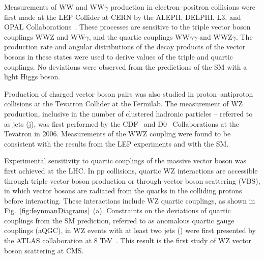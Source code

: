 Measurements of WW and WW$\gamma$ production in electron--positron collisions
were first made at the LEP
Collider at CERN by the ALEPH, DELPHI, L3, and OPAL Collaborations~\cite{LEP-2}.
These processes are sensitive to the triple vector boson couplings
WWZ and WW$\gamma$, and the quartic couplings WW$\gamma\gamma$
and WWZ$\gamma$. The production rate and angular distributions of the decay
products of the vector bosons in these states were used to derive values 
of the triple and quartic couplings. No deviations were observed from the 
predictions of the SM with a light Higgs boson.

Production of charged vector boson pairs was also studied in proton--antiproton
collisions at the Tevatron Collider at the Fermilab. 
The measurement of WZ production, inclusive in the
number of clustered hadronic particles -- referred to as jets (j), was
first performed by the CDF~\cite{Aaltonen:2012vu,Abulencia:2007tu} 
and D0~\cite{Abazov:2012cj} Collaborations at the Tevatron in 2006. 
Measurements of the WWZ coupling were found to be consistent with the results
from the LEP experiments and with the SM.

Experimental sensitivity to quartic couplings of the massive vector boson 
was first achieved at the LHC.
In pp collisions, quartic WZ interactions are accessible through triple 
vector boson production or through vector boson scattering (VBS), 
in which vector bosons are radiated from the quarks in the colliding protons 
before interacting.
These interactions include WZ quartic couplings, as shown in Fig.~\ref{fig:feynmanDiagrams}~(a). 
Constraints on the deviations of quartic couplings from the SM prediction, 
referred to as anomalous quartic gauge couplings (aQGC), in 
WZ events with at least two jets (\WZjj) were first
presented by the ATLAS collaboration at 8 TeV~\cite{Aad:2016ett}. This result
is the first study of WZ vector boson scattering at CMS. 

